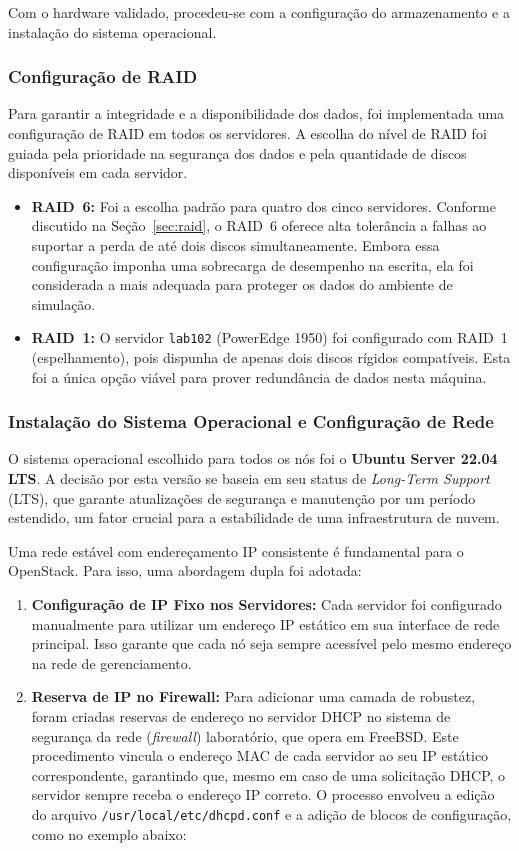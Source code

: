 Com o hardware validado, procedeu-se com a configuração do armazenamento e a instalação do sistema operacional.

\subsubsection*{Configuração de RAID}
Para garantir a integridade e a disponibilidade dos dados, foi implementada uma configuração de RAID em todos os servidores. A escolha do nível de RAID foi guiada pela prioridade na segurança dos dados e pela quantidade de discos disponíveis em cada servidor.

\begin{itemize}
    \item \textbf{RAID~6:} Foi a escolha padrão para quatro dos cinco servidores. Conforme discutido na Seção~\ref{sec:raid}, o RAID~6 oferece alta tolerância a falhas ao suportar a perda de até dois discos simultaneamente. Embora essa configuração imponha uma sobrecarga de desempenho na escrita, ela foi considerada a mais adequada para proteger os dados do ambiente de simulação.
    \item \textbf{RAID~1:} O servidor \texttt{lab102} (PowerEdge 1950) foi configurado com RAID~1 (espelhamento), pois dispunha de apenas dois discos rígidos compatíveis. Esta foi a única opção viável para prover redundância de dados nesta máquina.
\end{itemize}

\subsubsection*{Instalação do Sistema Operacional e Configuração de Rede}
O sistema operacional escolhido para todos os nós foi o \textbf{Ubuntu Server 22.04 LTS}. A decisão por esta versão se baseia em seu status de \textit{Long-Term Support} (LTS), que garante atualizações de segurança e manutenção por um período estendido, um fator crucial para a estabilidade de uma infraestrutura de nuvem.

Uma rede estável com endereçamento IP consistente é fundamental para o OpenStack. Para isso, uma abordagem dupla foi adotada:

\begin{enumerate}
    \item \textbf{Configuração de IP Fixo nos Servidores:} Cada servidor foi configurado manualmente para utilizar um endereço IP estático em sua interface de rede principal. Isso garante que cada nó seja sempre acessível pelo mesmo endereço na rede de gerenciamento.
    \item \textbf{Reserva de IP no Firewall:} Para adicionar uma camada de robustez, foram criadas reservas de endereço no servidor DHCP no sistema de segurança da rede (\textit{firewall}) laboratório, que opera em FreeBSD. Este procedimento vincula o endereço MAC de cada servidor ao seu IP estático correspondente, garantindo que, mesmo em caso de uma solicitação DHCP, o servidor sempre receba o endereço IP correto. O processo envolveu a edição do arquivo \texttt{/usr/local/etc/dhcpd.conf} e a adição de blocos de configuração, como no exemplo abaixo:
\end{enumerate}

